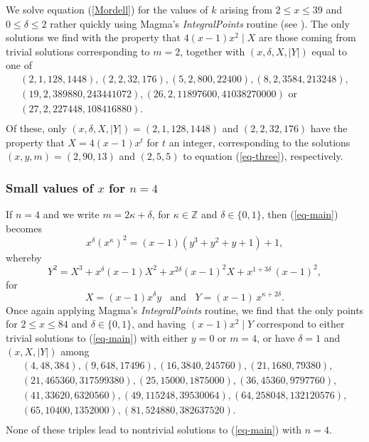 We solve equation (\ref{Mordell}) for the values of $k$ arising from $2 \leq x \leq 39$ and $0 \leq \delta \leq 2$ rather quickly using Magma's {\it IntegralPoints} routine (see \cite{magma}). The only solutions we find with the property that $4 (x-1) x^2 \mid X$ are those coming from trivial solutions corresponding to $m =2$, together with $(x,\delta,X,|Y|)$ equal to one of
$$
\begin{array}{c}
(2,1,128,1448), (2,2,32,176), (5,2,800,22400), (8,2,3584,213248),  \\
(19,2,389880,243441072), (26,2,11897600,41038270000) \mbox{ or } \\
(27,2,227448,108416880). \\
\end{array}
$$
Of these, only  $(x,\delta,X,|Y|)=(2,1,128,1448)$ and $(2,2,32,176)$ have the property that $X= 4 (x-1) x^{t}$ for $t$ an integer, corresponding to  the solutions $(x,y,m)=(2,90,13)$ and $(2,5,5)$ to equation (\ref{eq-three}), respectively.


 \subsubsection{Small values of $x$ for $n=4$}

 If $n=4$ and we write $m=2 \kappa + \delta$, for $\kappa \in\mathbb{Z}$ and $\delta \in \{ 0, 1 \}$, then (\ref{eq-main}) becomes
 $$
 x^\delta (x^\kappa)^2 = (x-1) ( y^3+y^2+y+1) + 1,
 $$
 whereby
 $$
 Y^2 = X^3 + x^\delta (x-1)X^2 + x^{2 \delta} (x-1)^2 X + x^{1+3 \delta} \, (x-1)^2,
 $$
for
 $$
 X=(x-1) x^\delta y \; \; \mbox{ and } \; \;  Y=(x-1) \, x^{\kappa+2 \delta}.
 $$
 Once again applying Magma's {\it IntegralPoints} routine, we find that the only points for $2 \leq x \leq 84$ and $\delta \in \{0, 1 \}$, and having $(x-1) x^2 \mid Y$ correspond to either trivial solutions to (\ref{eq-main}) with either $y=0$ or $m=4$, or have $\delta=1$ and  $(x,X,|Y|)$ among
 $$
 \begin{array}{c}
 (4,48,384), (9,648,17496), (16,3840,245760), (21,1680,79380), \\
(21,465360,317599380), (25,15000,1875000), (36,45360,9797760), \\
(41,33620,6320560), (49,115248,39530064), (64,258048,132120576), \\
(65,10400,1352000), (81,524880,382637520). \\
\end{array}
 $$
None of these triples lead to nontrivial solutions to (\ref{eq-main}) with $n=4$.
 
